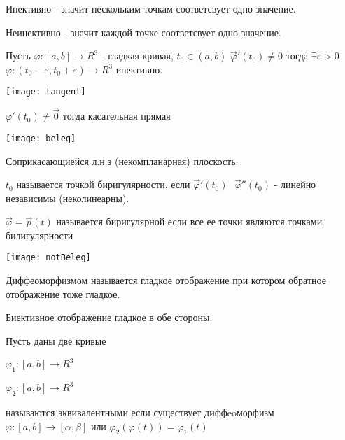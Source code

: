 \begin{define}
  Инективно - значит нескольким точкам соответсвует одно значение.

  Неинективно - значит каждой точке соответсвует одно значение.
\end{define}

\begin{theorem}
  Пусть $\varphi : [a,b] \to R^3$ - гладкая кривая, $t_0 \in (a,b)$
  $\vec \varphi' (t_0) \not = 0$ тогда $\exists \varepsilon > 0$
  $\varphi : (t_0 - \varepsilon, t_0 + \varepsilon) \to R^3$ инективно.
\end{theorem}

\begin{define}
  \texttt{[image: tangent]}

  $\varphi' (t_0) \not = \vec 0$ тогда касательная прямая
\end{define}

\begin{define}
  \texttt{[image: beleg]}

  Соприкасающиейся  л.н.з (некомпланарная) плоскость.
\end{define}

\begin{define}[бирегулярности]
  $t_0$ называется точкой биригулярности, если $\vec \varphi' (t_0) ~~~
  \vec \varphi''(t_0)$ - линейно независимы (неколинеарны).
\end{define}

\begin{define}
  $\vec \varphi = \vec p(t)$ называется биригулярной если все ее точки являются
  точками билигулярности

  \texttt{[image: notBeleg]}
\end{define}

\begin{define}[диффеоморфизма]
  Диффеоморфизмом называется гладкое отображение при котором обратное
  отображение тоже гладкое.
\end{define}

Биективное отображение гладкое в обе стороны.

\begin{define}
  Пусть даны две кривые

  $\varphi_1 : [a,b] \to R^3$

  $\varphi_2 : [a,b] \to R^3$

  называются эквивалентными если существует диффeoморфизм
  $\varphi : [a,b] \to [\alpha, \beta]$ или $\varphi_2(\varphi(t)) =
  \varphi_1(t)$
\end{define}

